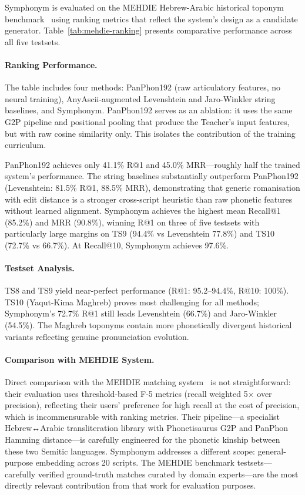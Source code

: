 \documentclass[11pt,a4paper]{article}
\begin{document}
Symphonym is evaluated on the MEHDIE Hebrew-Arabic historical toponym benchmark~\citep{mehdie2025} using ranking metrics that reflect the system's design as a candidate generator. Table~\ref{tab:mehdie-ranking} presents comparative performance across all five testsets.

\paragraph{Ranking Performance.} The table includes four methods: PanPhon192 (raw articulatory features, no neural training), AnyAscii-augmented Levenshtein and Jaro-Winkler string baselines, and Symphonym. PanPhon192 serves as an ablation: it uses the same G2P pipeline and positional pooling that produce the Teacher's input features, but with raw cosine similarity only. This isolates the contribution of the training curriculum.

PanPhon192 achieves only 41.1\% R@1 and 45.0\% MRR---roughly half the trained system's performance. The string baselines substantially outperform PanPhon192 (Levenshtein: 81.5\% R@1, 88.5\% MRR), demonstrating that generic romanisation with edit distance is a stronger cross-script heuristic than raw phonetic features without learned alignment. Symphonym achieves the highest mean Recall@1 (85.2\%) and MRR (90.8\%), winning R@1 on three of five testsets with particularly large margins on TS9 (94.4\% vs Levenshtein 77.8\%) and TS10 (72.7\% vs 66.7\%). At Recall@10, Symphonym achieves 97.6\%.

\paragraph{Testset Analysis.} TS8 and TS9 yield near-perfect performance (R@1: 95.2--94.4\%, R@10: 100\%). TS10 (Yaqut-Kima Maghreb) proves most challenging for all methods; Symphonym's 72.7\% R@1 still leads Levenshtein (66.7\%) and Jaro-Winkler (54.5\%). The Maghreb toponyms contain more phonetically divergent historical variants reflecting genuine pronunciation evolution.

\paragraph{Comparison with MEHDIE System.} Direct comparison with the MEHDIE matching system~\citep{mehdie2025} is not straightforward: their evaluation uses threshold-based F-5 metrics (recall weighted 5$\times$ over precision), reflecting their users' preference for high recall at the cost of precision, which is incommensurable with ranking metrics. Their pipeline---a specialist Hebrew↔Arabic transliteration library with Phonetisaurus G2P and PanPhon Hamming distance---is carefully engineered for the phonetic kinship between these two Semitic languages. Symphonym addresses a different scope: general-purpose embedding across 20 scripts. The MEHDIE benchmark testsets---carefully verified ground-truth matches curated by domain experts---are the most directly relevant contribution from that work for evaluation purposes.
\end{document}
